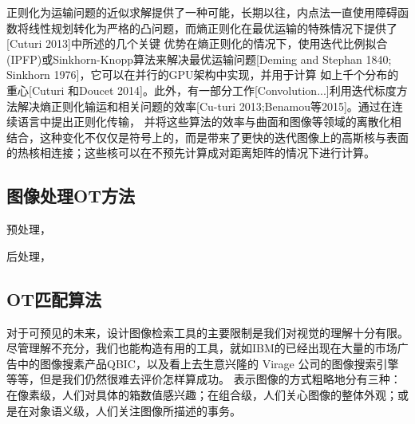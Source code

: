 正则化为运输问题的近似求解提供了一种可能，长期以往，内点法一直使用障碍函数将线性规划转化为严格的凸问题，而熵正则化在最优运输的特殊情况下提供了[Cuturi 2013]中所述的几个关键
优势在熵正则化的情况下，使用迭代比例拟合(IPFP)或Sinkhorn-Knopp算法来解决最优运输问题[Deming and Stephan 1840; Sinkhorn 1976]，它可以在并行的GPU架构中实现，并用于计算
如上千个分布的重心[Cuturi 和Doucet 2014]。此外，有一部分工作[Convolution...]利用迭代标度方法解决熵正则化输运和相关问题的效率[Cu-turi 2013;Benamou等2015]。通过在连续语言中提出正则化传输，
并将这些算法的效率与曲面和图像等领域的离散化相结合，这种变化不仅仅是符号上的，而是带来了更快的迭代图像上的高斯核与表面的热核相连接；这些核可以在不预先计算成对距离矩阵的情况下进行计算。

\subsection{图像处理OT方法}

预处理，

后处理，

\subsection{OT匹配算法}

对于可预见的未来，设计图像检索工具的主要限制是我们对视觉的理解十分有限。尽管理解不充分，我们也能构造有用的工具，就如IBM的已经出现在大量的市场广告中的图像搜素产品QBIC，以及看上去生意兴隆的
Virage 公司的图像搜索引擎等等，但是我们仍然很难去评价怎样算成功。
表示图像的方式粗略地分有三种：在像素级，人们对具体的箱数值感兴趣；在组合级，人们关心图像的整体外观；或是在对象语义级，人们关注图像所描述的事务。

